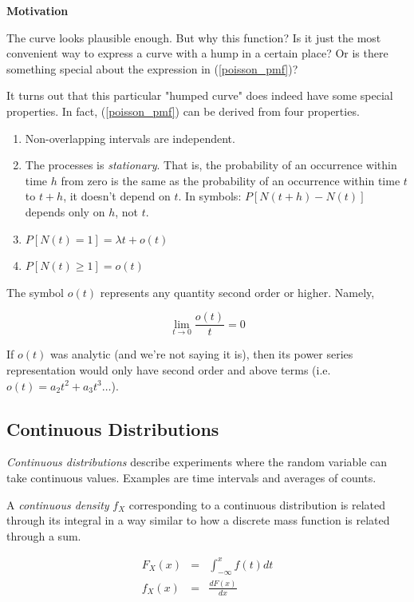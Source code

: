 \documentclass[]{article}
\begin{document}
\textbf{Motivation}

The curve looks plausible
enough.  But why this function?  Is it just the most
convenient way to express a curve with a hump in a certain
place?  Or is there something special about the expression
in (\ref{poisson_pmf})?

It turns out that this particular "humped curve" does indeed
have some special properties.  In fact, (\ref{poisson_pmf})
can be derived from four properties.

\begin{enumerate}

\item Non-overlapping intervals are independent.

\item The processes is \emph{stationary}.  That is,
  the probability of an occurrence within time $h$
  from zero is the same as the probability of an occurrence
  within time $t$ to $t + h$, it doesn't depend on $t$.
  In symbols: $P[N(t+h)-N(t)]$ depends only on $h$, not $t$.
  
\item $P[N(t) = 1] = \lambda t + o(t)$

\item $P[N(t) \ge 1] = o(t)$

\end{enumerate}

The symbol $o(t)$ represents any quantity second order or
higher.  Namely,

$$
\lim_{t \rightarrow 0} \frac{o(t)}{t} = 0
$$

If $o(t)$ was analytic (and we're not saying it is), then
its power series representation would only have second
order and above terms (i.e. $o(t) = a_2t^2 + a_3t^3 \ldots$).

\subsection{Continuous Distributions}

\emph{Continuous distributions} describe experiments where
the random variable can take continuous values.  Examples
are time intervals and averages of counts.

A \emph{continuous density} $f_X$ corresponding to a continuous
distribution is related through its integral in a way similar to
how a discrete mass function is related through a sum.

\begin{eqnarray*}
F_X(x) & = & \int_{-\infty}^x f(t) dt \\
f_X(x) & = & \frac{dF(x)}{dx}
\end{eqnarray*}
\end{document}

